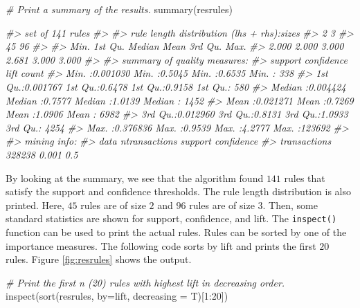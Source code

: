 \documentclass[
  11pt,
]{krantz}
\newenvironment{Shaded}{\begin{snugshade}}{\end{snugshade}}
\newcommand{\AttributeTok}[1]{\textcolor[rgb]{0.61,0.61,0.61}{#1}}
\newcommand{\CommentTok}[1]{\textcolor[rgb]{0.37,0.37,0.37}{\textit{#1}}}
\newcommand{\DecValTok}[1]{\textcolor[rgb]{0.06,0.06,0.06}{#1}}
\newcommand{\FunctionTok}[1]{\textcolor[rgb]{0,0,0}{#1}}
\newcommand{\NormalTok}[1]{#1}
\newcommand{\SpecialCharTok}[1]{\textcolor[rgb]{0,0,0}{#1}}
\newcommand{\StringTok}[1]{\textcolor[rgb]{0.5,0.5,0.5}{#1}}
\begin{document}
\begin{Shaded}
\begin{Highlighting}[]
\CommentTok{\# Print a summary of the results.}
\FunctionTok{summary}\NormalTok{(resrules)}

\CommentTok{\#\textgreater{} set of 141 rules}
\CommentTok{\#\textgreater{} }
\CommentTok{\#\textgreater{} rule length distribution (lhs + rhs):sizes}
\CommentTok{\#\textgreater{} 2  3 }
\CommentTok{\#\textgreater{} 45 96 }
\CommentTok{\#\textgreater{} }
\CommentTok{\#\textgreater{} Min. 1st Qu.  Median    Mean 3rd Qu.    Max. }
\CommentTok{\#\textgreater{} 2.000   2.000   3.000   2.681   3.000   3.000 }
\CommentTok{\#\textgreater{} }
\CommentTok{\#\textgreater{} summary of quality measures:}
\CommentTok{\#\textgreater{}   support           confidence          lift            count       }
\CommentTok{\#\textgreater{} Min.   :0.001030   Min.   :0.5045   Min.   :0.6535   Min.   :   338  }
\CommentTok{\#\textgreater{} 1st Qu.:0.001767   1st Qu.:0.6478   1st Qu.:0.9158   1st Qu.:   580  }
\CommentTok{\#\textgreater{} Median :0.004424   Median :0.7577   Median :1.0139   Median :  1452  }
\CommentTok{\#\textgreater{} Mean   :0.021271   Mean   :0.7269   Mean   :1.0906   Mean   :  6982  }
\CommentTok{\#\textgreater{} 3rd Qu.:0.012960   3rd Qu.:0.8131   3rd Qu.:1.0933   3rd Qu.:  4254  }
\CommentTok{\#\textgreater{} Max.   :0.376836   Max.   :0.9539   Max.   :4.2777   Max.   :123692  }
\CommentTok{\#\textgreater{} }
\CommentTok{\#\textgreater{} mining info:}
\CommentTok{\#\textgreater{}   data ntransactions support confidence}
\CommentTok{\#\textgreater{} transactions        328238   0.001        0.5}
\end{Highlighting}
\end{Shaded}

By looking at the summary, we see that the algorithm found \(141\) rules that satisfy the support and confidence thresholds. The rule length distribution is also printed. Here, \(45\) rules are of size \(2\) and \(96\) rules are of size \(3\). Then, some standard statistics are shown for support, confidence, and lift. The \texttt{inspect()} function can be used to print the actual rules. Rules can be sorted by one of the importance measures. The following code sorts by lift and prints the first \(20\) rules. Figure \ref{fig:resrules} shows the output.

\begin{Shaded}
\begin{Highlighting}[]
\CommentTok{\# Print the first n (20) rules with highest lift in decreasing order.}
\FunctionTok{inspect}\NormalTok{(}\FunctionTok{sort}\NormalTok{(resrules, }\AttributeTok{by=}\StringTok{\textquotesingle{}lift\textquotesingle{}}\NormalTok{, }\AttributeTok{decreasing =}\NormalTok{ T)[}\DecValTok{1}\SpecialCharTok{:}\DecValTok{20}\NormalTok{])}
\end{Highlighting}
\end{Shaded}
\end{document}

